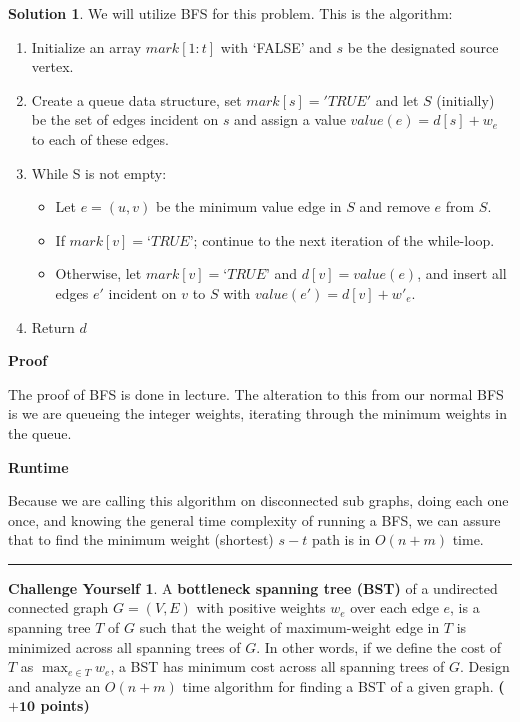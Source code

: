 \documentclass{article}
\theoremstyle{definition}
\newtheorem*{challenge}{Challenge Yourself}
\def\fline{\rule{0.75\linewidth}{0.5pt}}
\newcommand{\finishline}{\begin{center}\fline\end{center}}
\newtheorem*{solution*}{Solution}
\newenvironment{solution}{\begin{solution*}}{{\finishline} \end{solution*}}
\newcommand{\grade}[1]{\hfill{\textbf{($\mathbf{#1}$ points)}}}
\begin{document}
\begin{solution}
\item We will utilize BFS for this problem. This is the algorithm:
\begin{enumerate}
\item Initialize an array $mark[1 : t]$ with ‘FALSE’ and $s$ be the designated source vertex.
\item Create a queue data structure, set $mark[s] = 'TRUE'$ and let $S$ (initially)  be  the  set  of  edges  incident  on $s$ and  assign  a  value $value(e) =d[s] + w_e$ to each of these edges.
\item While S is not empty:
\begin{itemize}
\item  Let $e= (u, v)$ be the minimum value edge in $S$ and remove $e$ from $S$.
\item If $mark[v] = ‘TRUE’$; continue to the next iteration of the while-loop.
\item Otherwise, let $mark[v] = ‘TRUE’$ and $d[v] =value(e)$, and insert all edges $e'$ incident on $v$ to $S$ with $value(e') = d[v] + w'_e$.
\end{itemize}
\item Return $d$
\end{enumerate}

\item \textbf{Proof}
\item The proof of BFS is done in lecture. The alteration to this from our normal BFS is we are queueing the integer weights, iterating through the minimum weights in the queue. 

\item \textbf{Runtime}
\item Because we are calling this algorithm on disconnected sub graphs, doing each one once, and knowing the general time complexity of running a BFS, we can  assure that to find the minimum weight (shortest) $s-t$ path is in $O(n+m)$ time.

\end{solution}

\smallskip



\smallskip

\begin{challenge}
	A \textbf{bottleneck spanning tree (BST)} of a undirected connected graph $G=(V,E)$ with positive weights $w_e$ over each edge $e$, is a spanning tree $T$ of $G$ such that the weight of maximum-weight edge in $T$ is minimized 
	across all spanning trees of $G$. In other words, if we define the cost of $T$ as $\max_{e \in T} w_e$, a BST has minimum cost across all spanning trees of $G$. Design and analyze an $O(n+m)$ time algorithm for finding a BST of a given graph. 
	  \grade{+10}
\end{challenge}
\end{document}
